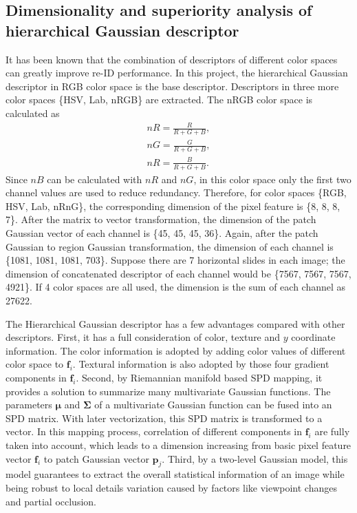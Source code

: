\subsection{Dimensionality and superiority analysis of hierarchical Gaussian descriptor}
It has been known that the combination of descriptors of different color spaces can greatly improve re-ID performance. In this project, the hierarchical Gaussian descriptor in RGB color space is the base descriptor. Descriptors in three more color spaces \{HSV, Lab, nRGB\} are extracted. The nRGB color space is calculated as 
\begin{equation}
\begin{aligned}
nR = \frac{R}{R+G+B},\\
nG = \frac{G}{R+G+B},\\
nR = \frac{B}{R+G+B}.
\end{aligned}
\end{equation}
Since $nB$ can be calculated with $nR$ and $nG$, in this color space only the first two channel values are used to reduce redundancy. Therefore, for color spaces \{RGB, HSV, Lab, nRnG\}, the corresponding dimension of the pixel feature is \{8, 8, 8, 7\}. After the matrix to vector transformation, the dimension of the patch Gaussian vector of each channel is \{45, 45, 45, 36\}. Again, after the patch Gaussian to region Gaussian transformation, the dimension of each channel is \{1081, 1081, 1081, 703\}. Suppose there are 7 horizontal slides in each image; the dimension of concatenated descriptor of each channel would be \{7567, 7567, 7567, 4921\}. If 4 color spaces are all used, the dimension is the sum of each channel as 27622. 

The Hierarchical Gaussian descriptor has a few advantages compared with other descriptors. First, it has a full consideration of color, texture and $y$ coordinate information. The color information is adopted by adding color values of different color space to $\bm{f}_i$. Textural information is also adopted by those four gradient components in $\bm{f}_i$. Second, by Riemannian manifold based SPD mapping, it provides a solution to summarize many multivariate Gaussian functions. The parameters $\bm{\mu}$ and $\bm{\Sigma}$ of a multivariate Gaussian function can be fused into an SPD matrix. With later vectorization, this SPD matrix is transformed to a vector. In this mapping process, correlation of different components in $\bm{f}_i$ are fully taken into account, which leads to a dimension increasing from basic pixel feature vector $\bm{f}_i$ to patch Gaussian vector $\bm{p}_j$. Third, by a two-level Gaussian model, this model guarantees to extract the overall statistical information of an image while being robust to local details variation caused by factors like viewpoint changes and partial occlusion. 

